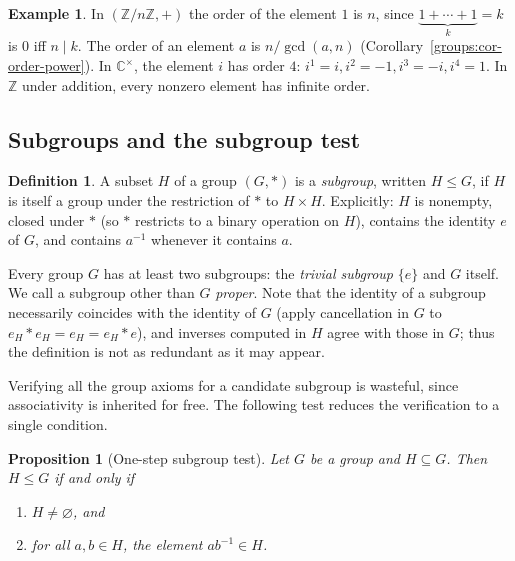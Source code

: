 \documentclass[11pt,a4paper]{article}
\newtheorem{proposition}[theorem]{Proposition}
\theoremstyle{definition}
\newtheorem{definition}[theorem]{Definition}
\newtheorem{example}[theorem]{Example}
\theoremstyle{remark}
\newcommand{\Z}{\ensuremath{\mathbb{Z}}}
\providecommand{\C}{}\renewcommand{\C}{\ensuremath{\mathbb{C}}}
\begin{document}
\begin{example}\label{groups:exa-orders}
In \((\Z/n\Z,+)\) the order of the element \(1\) is \(n\), since \(\underbrace{1+\cdots+1}_{k} = k\) is \(0\) iff \(n \mid k\). The order of an element \(a\) is \(n/\gcd(a,n)\) (Corollary~\ref{groups:cor-order-power}). In \(\C^\times\), the element \(i\) has order \(4\): \(i^1=i, i^2=-1, i^3=-i, i^4=1\). In \(\Z\) under addition, every nonzero element has infinite order.
\end{example}

\subsection{Subgroups and the subgroup test}

\begin{definition}\label{groups:def-subgroup}
A subset \(H\) of a group \((G,\ast)\) is a \emph{subgroup}, written \(H \le G\), if \(H\) is itself a group under the restriction of \(\ast\) to \(H \times H\). Explicitly: \(H\) is nonempty, closed under \(\ast\) (so \(\ast\) restricts to a binary operation on \(H\)), contains the identity \(e\) of \(G\), and contains \(a^{-1}\) whenever it contains \(a\).
\end{definition}

Every group \(G\) has at least two subgroups: the \emph{trivial subgroup} \(\{e\}\) and \(G\) itself. We call a subgroup other than \(G\) \emph{proper}. Note that the identity of a subgroup necessarily coincides with the identity of \(G\) (apply cancellation in \(G\) to \(e_H \ast e_H = e_H = e_H \ast e\)), and inverses computed in \(H\) agree with those in \(G\); thus the definition is not as redundant as it may appear.

Verifying all the group axioms for a candidate subgroup is wasteful, since associativity is inherited for free. The following test reduces the verification to a single condition.

\begin{proposition}[One-step subgroup test]\label{groups:prop-subgroup-test}
Let \(G\) be a group and \(H \subseteq G\). Then \(H \le G\) if and only if
\begin{enumerate}
\item \(H \neq \varnothing\), and
\item for all \(a,b \in H\), the element \(a b^{-1} \in H\).
\end{enumerate}
\end{proposition}
\end{document}
